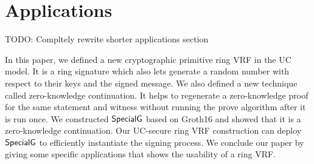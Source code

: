 
\section{Applications}
\label{sec:applicaitons_short}

TODO: Compltely rewrite shorter applications section


In this paper,  we defined a new cryptographic primitive ring VRF in the UC model. It is a ring signature which also lets generate a random number with respect to their keys and the signed message. We  also defined a new technique called zero-knowledge continuation. It helps to regenerate a zero-knowledge proof for the same statement and witness without running the prove algorithm after it is run once. We constructed  $ {\mathsf{SpecialG}} $ based on Groth16 \cite{Groth16} and showed that it is a zero-knowledge continuation. Our UC-secure ring VRF construction can deploy $ {\mathsf{SpecialG}} $ to efficiently instantiate the signing process. 
We conclude our paper by giving some specific applications that shows the usability of a ring VRF.

